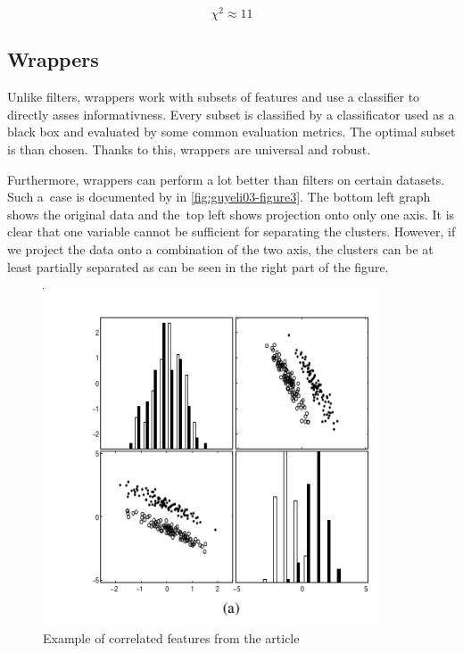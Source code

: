 \begin{equation}
\chi^2 \approx 11
\end{equation}



\subsection{Wrappers}

Unlike filters, wrappers work with subsets of features
and use a classifier to directly asses informativness.
Every subset is classified by a classificator used as a black box
and evaluated by some common evaluation metrics.
The optimal subset is than chosen.
Thanks to this, wrappers are universal and robust.

Furthermore, wrappers can perform a lot better than filters on certain datasets.
Such a~case is documented by \citet{GuyEli03} in \autoref{fig:guyeli03-figure3}.
The bottom left graph shows the original data and the~top left shows projection onto only one axis.
It is clear that one variable cannot be sufficient for separating the clusters.
However, if we project the data onto a combination of the two axis,
the clusters can be at least partially separated as can be seen in the right part of the figure.
 

\begin{figure}[ht]\centering
\includegraphics[width=100mm]{../img/guyeli_figure3.png}
\caption{Example of correlated features from the article}
\label{fig:guyeli03-figure3}
\end{figure}

